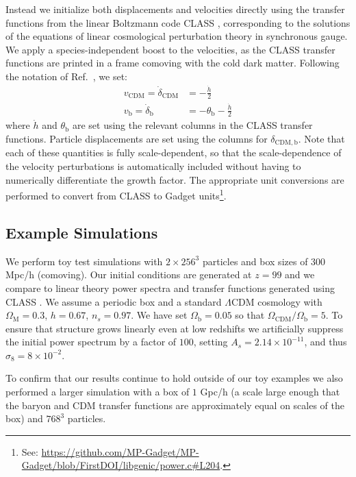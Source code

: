 \documentclass[a4paper,11pt]{article}
\begin{document}
Instead we initialize both displacements and velocities directly using the transfer functions from the linear Boltzmann code CLASS \cite{CLASS}, corresponding to the solutions of the equations of linear cosmological perturbation theory in synchronous gauge. We apply a species-independent boost to the velocities, as the CLASS transfer functions are printed in a frame comoving with the cold dark matter. Following the notation of Ref.~\cite{Ma:1995}, we set:
\begin{align}
 v_\mathrm{CDM} = \dot{\delta}_\mathrm{CDM}  &= - \frac{\dot{h}}{2} \\
 v_\mathrm{b} = \dot{\delta}_\mathrm{b}  &= - \theta_\mathrm{b} - \frac{\dot{h}}{2}
\end{align}
where $\dot{h}$ and $\theta_\mathrm{b}$ are set using the relevant columns in the CLASS transfer functions.
Particle displacements are set using the columns for $\delta_\mathrm{CDM, b}$. Note that each of these quantities is fully scale-dependent, so that the scale-dependence of the velocity perturbations is automatically included without having to numerically differentiate the growth factor. The appropriate unit conversions are performed to convert from CLASS to Gadget units\footnote{See: \protect\url{https://github.com/MP-Gadget/MP-Gadget/blob/FirstDOI/libgenic/power.c\#L204}.}.

\subsection{Example Simulations}

We perform toy test simulations with $2\times 256^3$ particles and box sizes of $300$ Mpc/h (comoving). Our initial conditions are generated at $z=99$ and we compare to linear theory power spectra and transfer functions generated using CLASS \cite{CLASS}. We assume a periodic box and a standard $\Lambda$CDM cosmology with $\Omega_\mathrm{M} = 0.3$, $h = 0.67$, $n_s = 0.97$. We have set $\Omega_\mathrm{b} = 0.05$ so that $\Omega_{\mathrm{CDM}}/ \Omega_\mathrm{b} = 5$.
To ensure that structure grows linearly even at low redshifts we artificially suppress the initial power spectrum by a factor of $100$, setting $A_s = 2.14\times 10^{-11}$, and thus $\sigma_8 = 8\times 10^{-2}$.

To confirm that our results continue to hold outside of our toy examples we also performed a larger simulation with a box of $1$ Gpc/h (a scale large enough that the baryon and CDM transfer functions are approximately equal on scales of the box) and $768^3$ particles.
\end{document}
